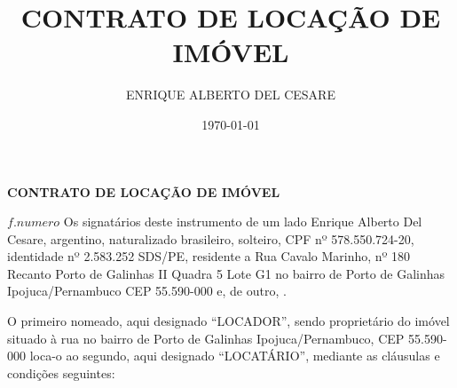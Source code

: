 \documentclass[a4paper,12pt]{article}
\date{\today}
\author{ENRIQUE ALBERTO DEL CESARE}
\title{CONTRATO DE LOCAÇÃO DE IMÓVEL}
\begin{document}
\thispagestyle{empty}
\begin{center}{\bf \huge CONTRATO DE LOCAÇÃO DE IMÓVEL}\\[5.1cm] \end{center} 
\newcommand\n{\newcommand}

${f.numero}$
Os signatários deste  instrumento de um lado Enrique Alberto Del Cesare,
argentino, naturalizado brasileiro, solteiro, CPF nº 578.550.724-20, identidade nº 2.583.252 SDS\//PE, 
residente a Rua Cavalo Marinho, nº 180 Recanto Porto de Galinhas II Quadra 5 Lote G1 
no bairro de Porto de Galinhas Ipojuca/Pernambuco CEP 55.590-000 e, de outro,
. 

O primeiro nomeado, aqui designado “LOCADOR”, sendo proprietário do imóvel situado à rua  
no bairro de Porto de Galinhas Ipojuca\//Pernambuco, CEP 55.590-000 loca-o ao segundo, aqui designado “LOCATÁRIO”, mediante as cláusulas e condições seguintes:
\end{document}
